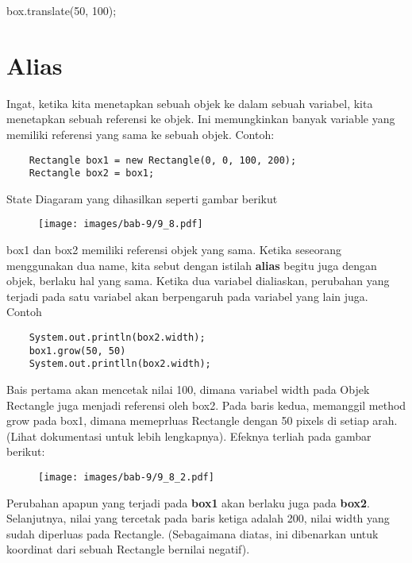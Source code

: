 	box.translate(50, 100); \\
	
\section{Alias}
Ingat, ketika kita menetapkan sebuah objek ke dalam sebuah variabel, kita menetapkan sebuah referensi ke objek. Ini memungkinkan banyak variable yang memiliki referensi yang sama ke sebuah objek. Contoh:

\begin{lstlisting}
	Rectangle box1 = new Rectangle(0, 0, 100, 200);
	Rectangle box2 = box1;
\end{lstlisting}

State Diagaram yang dihasilkan seperti gambar berikut \\
\begin{figure}[H]
	\centering \texttt{[image: images/bab-9/9\_8.pdf]}
\end{figure}
box1 dan box2 memiliki referensi objek yang sama. Ketika seseorang menggunakan dua name, kita sebut dengan istilah \textbf{alias} begitu juga dengan objek, berlaku hal yang sama.
Ketika dua variabel dialiaskan, perubahan yang terjadi pada satu variabel akan berpengaruh pada variabel yang lain juga. Contoh
\begin{lstlisting}
	System.out.println(box2.width);
	box1.grow(50, 50)
	System.out.printlln(box2.width);
\end{lstlisting}

Bais pertama akan mencetak nilai 100, dimana variabel width pada Objek Rectangle juga menjadi referensi oleh box2. Pada baris kedua, memanggil method grow pada box1, dimana memeprluas Rectangle dengan 50 pixels di setiap arah. (Lihat dokumentasi untuk lebih lengkapnya). Efeknya terliah pada gambar berikut: \\
\begin{figure}[H]
	\centering \texttt{[image: images/bab-9/9\_8\_2.pdf]}
\end{figure}

Perubahan apapun yang terjadi pada \textbf{box1} akan berlaku juga pada \textbf{box2}. Selanjutnya, nilai yang tercetak pada baris ketiga adalah 200, nilai width yang sudah diperluas pada Rectangle. (Sebagaimana diatas, ini dibenarkan untuk koordinat dari sebuah Rectangle bernilai negatif).

